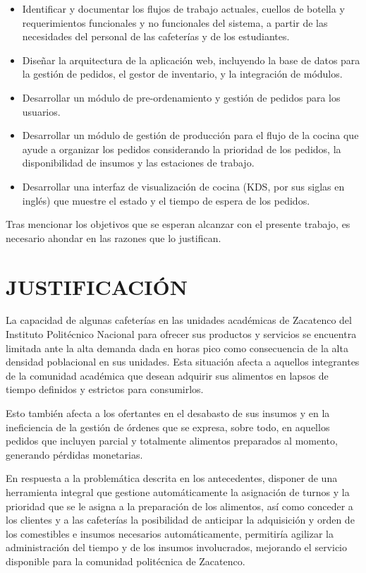 \begin{itemize}
	\item Identificar y documentar los flujos de trabajo actuales, cuellos de botella y requerimientos funcionales y no funcionales del sistema, a partir de las necesidades del personal de las cafeterías y de los estudiantes. 

	\item Diseñar la arquitectura de la aplicación web, incluyendo la base de datos para la gestión de pedidos, el gestor de inventario, y la integración de módulos. 

	\item Desarrollar un módulo de pre-ordenamiento y gestión de pedidos para los usuarios. 

	\item Desarrollar un módulo de gestión de producción para el flujo de la cocina que ayude a organizar los pedidos considerando la prioridad de los pedidos, la disponibilidad de insumos y las estaciones de trabajo. 

	\item Desarrollar una interfaz de visualización de cocina (KDS, por sus siglas en inglés) que muestre el estado y el tiempo de espera de los pedidos. 
\end{itemize}

Tras mencionar los objetivos que se esperan alcanzar con el presente trabajo, es necesario ahondar en las razones que lo justifican. 

\section{JUSTIFICACIÓN}
La capacidad de algunas cafeterías en las unidades académicas de Zacatenco del Instituto Politécnico Nacional para ofrecer sus productos y servicios se encuentra limitada ante la alta demanda dada en horas pico como consecuencia de la alta densidad poblacional en sus unidades. Esta situación afecta a aquellos integrantes de la comunidad académica que desean adquirir sus alimentos en lapsos de tiempo definidos y estrictos para consumirlos.  

Esto también afecta a los ofertantes en el desabasto de sus insumos y en la ineficiencia de la gestión de órdenes que se expresa, sobre todo, en aquellos pedidos que incluyen parcial y totalmente alimentos preparados al momento, generando pérdidas monetarias. 

En respuesta a la problemática descrita en los antecedentes, disponer de una herramienta integral que gestione automáticamente la asignación de turnos y la prioridad que se le asigna a la preparación de los alimentos, así como conceder a los clientes y a las cafeterías la posibilidad de anticipar la adquisición y orden de los comestibles e insumos necesarios automáticamente, permitiría agilizar la administración del tiempo y de los insumos involucrados, mejorando el servicio disponible para la comunidad politécnica de Zacatenco. 

